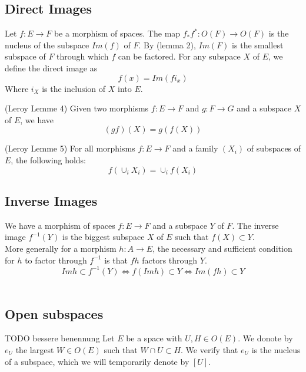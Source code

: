 \subsection{Direct Images}
\begin{definition}
    \label{def:direct_images}
    Let $f : E \rightarrow F$ be a morphism of spaces. The map $f_*f^* : O(F) \to O(F)$ is the nucleus of the subspace $Im(f)$ of $F$. By (lemma 2), $Im(F)$ is the smallest subspace of $F$ through which $f$ can be factored. For any subspace $X$ of $E$, we define the direct image as
    \[f(x) = Im(fi_x)\]
    Where $i_X$ is the inclusion of $X$ into $E$.
\end{definition}

\begin{lemma}
(Leroy Lemme 4)
    \label{lem:direct_images_transitive}
    Given two morphisms $f : E \rightarrow F$ and $g : F \rightarrow G$ and a subspace $X$ of $E$, we have
    \[(gf)(X) = g(f(X))\]
\end{lemma}

\begin{lemma}
(Leroy Lemme 5)
    \label{lem:direct_images_families}
    For all morphisms $f: E \rightarrow F$ and a family $(X_i)$ of subspaces of $E$, the following holds:
    \[f(\cup_i X_i) = \cup_i f(X_i)\]
\end{lemma}

\subsection{Inverse Images}
\begin{definition}
    \label{def:inverse_images}
    We have a morphism of spaces $f : E \rightarrow F$ and a subspace $Y$ of $F$. The inverse image $f^{-1}(Y)$ is the biggest subspace $X$ of $E$ such that $f(X) \subset Y$. \\
    More generally for a morphism $h : A \rightarrow E$, the necessary and sufficient condition for $h$ to factor through $f^{-1}$ is that $fh$ factors through $Y$.
    \[Im h \subset f^{-1}(Y)\iff f(Im h) \subset Y \iff Im(fh) \subset Y \] \
\end{definition}

\subsection{Open subspaces}
\begin{definition}[$e_U$]
    TODO bessere benennung
    \label{def:e_U}
    Let $E$ be a space with $U, H \in O(E)$. We donote by $e_U$ the largest $W \in O(E)$ such that $W \cap U \subset H$. We verify that $e_U$ is the nucleus of a subspace, which we will temporarily denote by $[U]$.
\end{definition}


